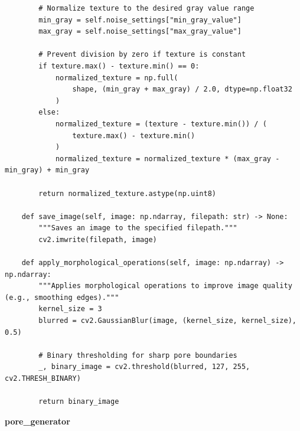 \documentclass[code]{wordcore}
\begin{document}
\begin{code}
\begin{verbatim}
        # Normalize texture to the desired gray value range
        min_gray = self.noise_settings["min_gray_value"]
        max_gray = self.noise_settings["max_gray_value"]

        # Prevent division by zero if texture is constant
        if texture.max() - texture.min() == 0:
            normalized_texture = np.full(
                shape, (min_gray + max_gray) / 2.0, dtype=np.float32
            )
        else:
            normalized_texture = (texture - texture.min()) / (
                texture.max() - texture.min()
            )
            normalized_texture = normalized_texture * (max_gray - min_gray) + min_gray

        return normalized_texture.astype(np.uint8)

    def save_image(self, image: np.ndarray, filepath: str) -> None:
        """Saves an image to the specified filepath."""
        cv2.imwrite(filepath, image)

    def apply_morphological_operations(self, image: np.ndarray) -> np.ndarray:
        """Applies morphological operations to improve image quality (e.g., smoothing edges)."""
        kernel_size = 3
        blurred = cv2.GaussianBlur(image, (kernel_size, kernel_size), 0.5)

        # Binary thresholding for sharp pore boundaries
        _, binary_image = cv2.threshold(blurred, 127, 255, cv2.THRESH_BINARY)

        return binary_image
  \end{verbatim}
\end{code}

\textbf{pore\_generator}
\end{document}
